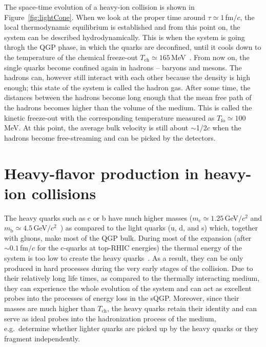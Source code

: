 The space-time evolution of a heavy-ion collision is shown in Figure~\ref{fig:lightCone}. When we look at the proper time around $\tau \simeq 1\,$fm$/c$, the local thermodynamic equilibrium is established and from this point on, the system can be described hydrodynamically. This is when the system is going throgh the QGP phase, in which the quarks are deconfined, until it cools down to the temperature of the chemical freeze-out $T_\mathrm{ch} \simeq 165\,$MeV~\cite{ALICE_lightFlavor,STAR_LightFlavor}\@. From now on, the single quarks become confined again in hadrons -- baryons and mesons. The hadrons can, however still interact with each other because the density is high enough; this state of the system is called the hadron gas. After some time, the distances between the hadrons become long enough that the mean free path of the hadrons becomes higher than the volume of the medium. This is called the kinetic freeze-out with the corresponding temperature measured as $T_\mathrm{fo} \simeq 100\,$MeV. At this point, the average bulk velocity is still about $\sim$1/2$c$ when the hadrons become free-streaming and can be picked by the detectors.


\section{Heavy-flavor production in heavy-ion collisions}

The heavy quarks such as c or b have much higher masses ($m_\mathrm{c} \simeq 1.25\,$GeV$/c^2$ and $m_\mathrm{b} \simeq 4.5\,$GeV$/c^2$~\cite{PDG}) as compared to the light quarks (u, d, and s) which, together with gluons, make most of the QGP bulk.  During most of the expansion (after $\sim 0.1\,$fm$/c$ for the c-quarks at top-RHIC energies) the thermal energy of the system is too low to create the heavy quarks~\cite{summaryHF,Prino_Rapp_HF}\@. As a result, they can be only produced in hard processes during the very early stages of the collision. Due to their relatively long life times, as compared to the thermally interacting medium, they can experience the whole evolution of the system and can act as excellent probes into the processes of energy loss in the sQGP\@. Moreover, since their masses are much higher than $T_\mathrm{ch}$, the heavy quarks retain their identity and can serve as ideal probes into the hadronization process of the medium, e.g.\ determine whether lighter quarks are picked up by the heavy quarks or they fragment independently.

